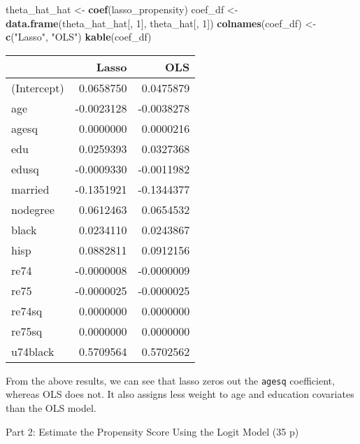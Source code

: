 \documentclass[
]{article}
\newenvironment{Shaded}{\begin{snugshade}}{\end{snugshade}}
\newcommand{\DecValTok}[1]{\textcolor[rgb]{0.00,0.00,0.81}{#1}}
\newcommand{\FunctionTok}[1]{\textcolor[rgb]{0.13,0.29,0.53}{\textbf{#1}}}
\newcommand{\NormalTok}[1]{#1}
\newcommand{\OtherTok}[1]{\textcolor[rgb]{0.56,0.35,0.01}{#1}}
\newcommand{\StringTok}[1]{\textcolor[rgb]{0.31,0.60,0.02}{#1}}
\begin{document}
\begin{enumerate}
\begin{enumerate}
\begin{Shaded}
\begin{Highlighting}[]
\NormalTok{theta\_hat\_hat }\OtherTok{\textless{}{-}} \FunctionTok{coef}\NormalTok{(lasso\_propensity)}
\NormalTok{coef\_df }\OtherTok{\textless{}{-}} \FunctionTok{data.frame}\NormalTok{(theta\_hat\_hat[, }\DecValTok{1}\NormalTok{], theta\_hat[, }\DecValTok{1}\NormalTok{])}
\FunctionTok{colnames}\NormalTok{(coef\_df) }\OtherTok{\textless{}{-}} \FunctionTok{c}\NormalTok{(}\StringTok{"Lasso"}\NormalTok{, }\StringTok{"OLS"}\NormalTok{)}
\FunctionTok{kable}\NormalTok{(coef\_df)}
\end{Highlighting}
\end{Shaded}

    \begin{longtable}[]{@{}lrr@{}}
    \toprule\noalign{}
    & Lasso & OLS \\
    \midrule\noalign{}
    \endhead
    \bottomrule\noalign{}
    \endlastfoot
    (Intercept) & 0.0658750 & 0.0475879 \\
    age & -0.0023128 & -0.0038278 \\
    agesq & 0.0000000 & 0.0000216 \\
    edu & 0.0259393 & 0.0327368 \\
    edusq & -0.0009330 & -0.0011982 \\
    married & -0.1351921 & -0.1344377 \\
    nodegree & 0.0612463 & 0.0654532 \\
    black & 0.0234110 & 0.0243867 \\
    hisp & 0.0882811 & 0.0912156 \\
    re74 & -0.0000008 & -0.0000009 \\
    re75 & -0.0000025 & -0.0000025 \\
    re74sq & 0.0000000 & 0.0000000 \\
    re75sq & 0.0000000 & 0.0000000 \\
    u74black & 0.5709564 & 0.5702562 \\
    \end{longtable}

    From the above results, we can see that lasso zeros out the
    \texttt{agesq} coefficient, whereas OLS does not. It also assigns
    less weight to age and education covariates than the OLS model.
  \end{enumerate}
\end{enumerate}

\begin{center}
{\LARGE Part 2: Estimate the Propensity Score Using the Logit Model (35 p)}
\end{center}
\end{document}
